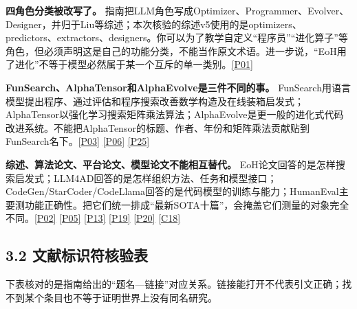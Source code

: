 \textbf{四角色分类被改写了。}
指南把LLM角色写成Optimizer、Programmer、Evolver、Designer，并归于Liu等综述；本次核验的综述v5使用的是optimizers、predictors、extractors、designers。你可以为了教学自定义``程序员''``进化算子''等角色，但必须声明这是自己的功能分类，不能当作原文术语。进一步说，``EoH用了进化''不等于模型必然属于某一个互斥的单一类别。\href{https://arxiv.org/abs/2410.14716v5}{{[}P01{]}}

\textbf{FunSearch、AlphaTensor和AlphaEvolve是三件不同的事。}
FunSearch用语言模型提出程序、通过评估和程序搜索改善数学构造及在线装箱启发式；AlphaTensor以强化学习搜索矩阵乘法算法；AlphaEvolve是更一般的进化式代码改进系统。不能把AlphaTensor的标题、作者、年份和矩阵乘法贡献贴到FunSearch名下。\href{https://deepmind.google/blog/funsearch-making-new-discoveries-in-mathematical-sciences-using-large-language-models/}{{[}P03{]}}
\href{https://arxiv.org/abs/2506.13131}{{[}P06{]}}
\href{https://deepmind.google/blog/discovering-novel-algorithms-with-alphatensor/}{{[}P25{]}}

\textbf{综述、算法论文、平台论文、模型论文不能相互替代。}
EoH论文回答的是怎样搜索启发式；LLM4AD回答的是怎样组织方法、任务和模型接口；CodeGen/StarCoder/CodeLlama回答的是代码模型的训练与能力；HumanEval主要测功能正确性。把它们统一排成``最新SOTA十篇''，会掩盖它们测量的对象完全不同。\href{https://arxiv.org/abs/2401.02051}{{[}P02{]}}
\href{https://arxiv.org/abs/2412.17287v2}{{[}P05{]}}
\href{https://arxiv.org/abs/2203.13474}{{[}P13{]}}
\href{https://arxiv.org/abs/2308.12950}{{[}P19{]}}
\href{https://arxiv.org/abs/2305.06161}{{[}P20{]}}
\href{https://github.com/openai/human-eval}{{[}C18{]}}

\subsection{3.2
文献标识符核验表}\label{ux6587ux732eux6807ux8bc6ux7b26ux6838ux9a8cux8868}

下表核对的是指南给出的``题名---链接''对应关系。链接能打开不代表引文正确；找不到某个条目也不等于证明世界上没有同名研究。


